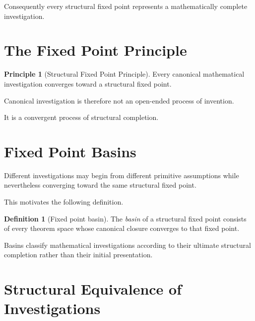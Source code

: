 \documentclass[13pt,openany]{book}
\theoremstyle{plain}
\theoremstyle{definition}
\newtheorem{definition}{Definition}[chapter]
\newtheorem{principle}{Principle}[chapter]
\begin{document}
Consequently every structural fixed point represents a mathematically complete
investigation.

\section{The Fixed Point Principle}

\begin{principle}[Structural Fixed Point Principle]

Every canonical mathematical investigation converges toward a structural fixed
point.

\end{principle}

Canonical investigation is therefore not an open-ended process of invention.

It is a convergent process of structural completion.

\section{Fixed Point Basins}

Different investigations may begin from different primitive assumptions while
nevertheless converging toward the same structural fixed point.

This motivates the following definition.

\begin{definition}[Fixed point basin]

The \emph{basin} of a structural fixed point consists of every theorem space
whose canonical closure converges to that fixed point.

\end{definition}

Basins classify mathematical investigations according to their ultimate
structural completion rather than their initial presentation.

\section{Structural Equivalence of Investigations}
\end{document}
